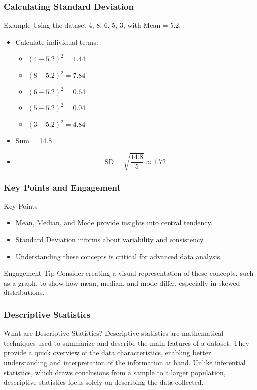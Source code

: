 \documentclass[aspectratio=169]{beamer}
\begin{document}
\begin{frame}[fragile]
    \frametitle{Calculating Standard Deviation}
    \begin{block}{Example}
        Using the dataset {4, 8, 6, 5, 3}, with Mean = 5.2:
        \begin{itemize}
            \item Calculate individual terms:
            \begin{itemize}
                \item \( (4 - 5.2)^2 = 1.44 \)
                \item \( (8 - 5.2)^2 = 7.84 \)
                \item \( (6 - 5.2)^2 = 0.64 \)
                \item \( (5 - 5.2)^2 = 0.04 \)
                \item \( (3 - 5.2)^2 = 4.84 \)
            \end{itemize}
            \item Sum = 14.8
            \item \[
            \text{SD} = \sqrt{\frac{14.8}{5}} \approx 1.72
            \]
        \end{itemize}
    \end{block}  
\end{frame}

\begin{frame}[fragile]
    \frametitle{Key Points and Engagement}
    \begin{block}{Key Points}
        \begin{itemize}
            \item Mean, Median, and Mode provide insights into central tendency.
            \item Standard Deviation informs about variability and consistency.
            \item Understanding these concepts is critical for advanced data analysis.
        \end{itemize}
    \end{block}

    \begin{block}{Engagement Tip}
        Consider creating a visual representation of these concepts, such as a graph, to show how mean, median, and mode differ, especially in skewed distributions.
    \end{block}
\end{frame}

\begin{frame}[fragile]
    \frametitle{Descriptive Statistics}
    \begin{block}{What are Descriptive Statistics?}
        Descriptive statistics are mathematical techniques used to summarize and describe the main features of a dataset. They provide a quick overview of the data characteristics, enabling better understanding and interpretation of the information at hand. Unlike inferential statistics, which draws conclusions from a sample to a larger population, descriptive statistics focus solely on describing the data collected.
    \end{block}
\end{frame}
\end{document}
